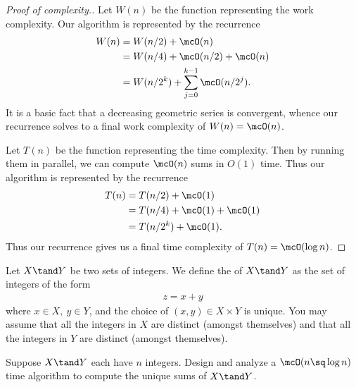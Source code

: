 \documentclass[10pt]{article}
\begin{document}
\begin{proof}[Proof of complexity.]
  Let $ W(n) $ be the function representing the work complexity.
  Our algorithm is represented by the recurrence \begin{align*}
    W(n) &= W(n/2) + \mcO(n) \\
         &= W(n/4) + \mcO(n/2) + \mcO(n) \\
         &= W(n/2^k) + \sum_{j=0}^{k-1} \mcO(n/2^j).
  \end{align*}
  It is a basic fact that a decreasing geometric series is convergent, whence our recurrence solves to a final work complexity of $ W(n) = \mcO(n) $.

  Let $ T(n) $ be the function representing the time complexity. Then by running them in parallel, we can compute $ \mcO(n) $ sums in $ O(1) $ time. Thus our algorithm is represented by the recurrence \begin{align*}
    T(n) &= T(n/2) + \mcO(1) \\
         &= T(n/4) + \mcO(1) + \mcO(1) \\
         &= T(n/2^k) + \mcO(1).
  \end{align*}
  Thus our recurrence gives us a final time complexity of $ T(n) = \mcO(\log n) $.
\end{proof}

\pagebreak
\setcounter{section}{4}
\setcounter{exercise}{2}
Let $ X \tand Y $ be two sets of integers. We define the  of $ X \tand Y $ as the set of integers of the form \begin{align*}
  z = x+y
\end{align*} where $ x\in X,\ y\in Y $, and the choice of $ (x,y) \in X\times Y $ is unique. You may assume that all the integers in $ X $ are distinct (amongst themselves) and that all the integers in $ Y $ are distinct (amongst themselves).

\begin{subexercise}
  Suppose $ X\tand Y $ each have $ n $ integers. Design and analyze a $ \mcO(n\sq \log n) $ time algorithm to compute the unique sums of $ X\tand Y $.
\end{subexercise}
\end{document}
